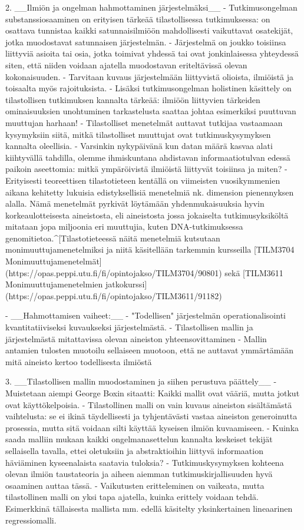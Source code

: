 \documentclass[
]{book}
\begin{document}
\begin{itemize}
2. __Ilmiön ja ongelman hahmottaminen järjestelmäksi__
  - Tutkimusongelman substanssiosaaminen on erityisen tärkeää tilastollisessa tutkimuksessa: on osattava tunnistaa kaikki satunnaisilmiöön mahdollisesti vaikuttavat osatekijät, jotka muodostavat satunnaisen järjestelmän.
  - Järjestelmä on joukko toisiinsa liittyviä asioita tai osia, jotka toimivat yhdessä tai ovat
jonkinlaisessa yhteydessä siten, että niiden voidaan ajatella muodostavan eriteltävissä olevan kokonaisuuden.
    - Tarvitaan kuvaus järjestelmään liittyvistä olioista, ilmiöistä ja toisaalta myös rajoituksista.
    - Lisäksi tutkimusongelman holistinen käsittely on tilastollisen tutkimuksen kannalta tärkeää: ilmiöön liittyvien tärkeiden ominaisuuksien unohtuminen tarkastelusta saattaa johtaa esimerkiksi puuttuvan muuttujan harhaan!
  - Tilastolliset menetelmät auttavat tutkijaa vastaamaan kysymyksiin siitä, mitkä tilastolliset muuttujat ovat tutkimuskysymyksen kannalta oleellisia.
    - Varsinkin nykypäivänä kun datan määrä kasvaa alati kiihtyvällä tahdilla, olemme ihmiskuntana ahdistavan informaatiotulvan edessä paikoin aseettomia: mitkä ympäröivistä ilmiöistä liittyvät toisiinsa ja miten?
    - Erityisesti teoreettisen tilastotieteen kentällä on viimeisten vuosikymmenien aikana kehitetty lukuisia edistyksellisiä menetelmiä nk. dimension pienennyksen alalla. Nämä menetelmät pyrkivät löytämään yhdenmukaisuuksia hyvin korkeaulotteisesta aineistosta, eli aineistosta jossa jokaiselta tutkimusyksiköltä mitataan jopa miljoonia eri muuttujia, kuten DNA-tutkimuksessa genomitietoa.^[Tilastotieteessä näitä menetelmiä kutsutaan monimuuttujamenetelmiksi ja niitä käsitellään tarkemmin kursseilla [TILM3704 Monimuuttujamenetelmät](https://opas.peppi.utu.fi/fi/opintojakso/TILM3704/90801) sekä [TILM3611 Monimuuttujamenetelmien jatkokurssi](https://opas.peppi.utu.fi/fi/opintojakso/TILM3611/91182)

- __Hahmottamisen vaiheet:__
  - "Todellisen" järjestelmän operationalisointi kvantitatiiviseksi kuvaukseksi järjestelmästä.
  - Tilastollisen mallin ja järjestelmästä mitattavissa olevan aineiston yhteensovittaminen   
  - Mallin antamien tulosten muotoilu sellaiseen muotoon, että ne auttavat ymmärtämään mitä aineisto kertoo todellisesta ilmiöstä

3. __Tilastollisen mallin muodostaminen ja siihen perustuva päättely__
  - Muistetaan aiempi George Boxin sitaatti: Kaikki mallit ovat vääriä, mutta jotkut ovat käyttökelpoisia.
    - Tilastollinen malli on vain kuvaus aineiston sisältämästä vaihtelusta: se ei ikinä täydellisesti ja tyhjentävästi vastaa aineiston generoinutta prosessia, mutta sitä voidaan silti käyttää kyseisen ilmiön kuvaamiseen.  
  - Kuinka saada malliin mukaan kaikki ongelmanasettelun kannalta keskeiset tekijät sellaisella tavalla, ettei oletuksiin ja abstraktioihin liittyvä informaation häviäminen kyseenalaista saatavia tuloksia?
    - Tutkimuskysymyksen kohteena olevan ilmiön taustateoria ja aiheen aiemman tutkimuskirjallisuuden hyvä osaaminen auttaa tässä.
  - Vaikutusten eritteleminen on vaikeata, mutta tilastollinen malli on yksi tapa ajatella, kuinka erittely voidaan tehdä. Esimerkkinä tällaisesta mallista mm. edellä käsitelty yksinkertainen lineaarinen regressiomalli.


\end{itemize}
\end{document}
